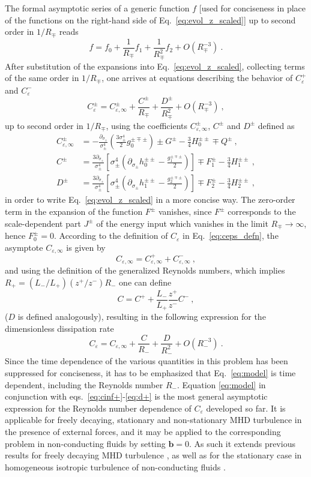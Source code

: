 \documentclass[aps,pre,onecolumn,superscriptaddress,notitlepage]{revtex4-1}
\newcommand{\Ceps}{C_\varepsilon}
\newcommand{\Cinf}{C_{\varepsilon,\infty}}
\newcommand{\sigmapm}{\sigma_\pm}
\renewcommand{\vec}[1]{\bm{#1}}
\newcommand{\beq}{\begin{equation}}
\newcommand{\eeq}{\end{equation}}
\begin{document}
The formal asymptotic series of a generic function $f$ [used for conciseness in place of
the functions on the right-hand side of Eq.~\eqref{eq:evol_z_scaled}]
up to second order in $1/R_\mp$ reads
\begin{equation}
\label{eq:asymp_F}
f= f_{0}+ \frac{1}{R_\mp}f_{1} 
+ \frac{1}{R_\mp^2}f_{2} + O(R_\mp^{-3}) \ .  
\end{equation}
After substitution of the expansions into
Eq.~\eqref{eq:evol_z_scaled}, collecting terms of the same order in $1/R_\mp$,
one arrives at equations describing the behavior of $\Ceps^+$ and $\Ceps^-$
\beq
\Ceps^\pm = \Cinf^\pm + \frac{C^\pm}{R_{\mp}} + \frac{D^\pm}{R_{\mp}^2} + O(R_{\mp}^{-3}) \ ,
 \label{eq:model+}
\eeq
up to second order in $1/R_{\mp}$,
using the coefficients $\Cinf^\pm$, $C^\pm$ and $D^\pm$ defined as
\begin{align}
\label{eq:cinf+}
\Cinf^\pm &= -\frac{\partial_{\sigmapm}}{\sigmapm^4} \left(\frac{3\sigmapm^4}{2}g_0^{\pm\mp\pm}\right)
  \pm  G^\pm - \frac{3}{4} H_{0}^{\pm\pm} \mp Q^\pm \ , \\
\label{eq:c+}
C^\pm &=\frac{3\partial_{\sigmapm}}{\sigmapm^4} \left[ \sigmapm^4 \left( \partial_{\sigmapm} 
h_{0}^{\pm\pm} - \frac{g_1^{\pm\mp\pm}}{2} \right)\right] 
 \mp F_1^\pm - \frac{3}{4} H_1^{\pm\pm}\ , \\ 
\label{eq:d+}
D^\pm &=\frac{3\partial_{\sigmapm}}{\sigmapm^4} \left[ \sigmapm^4 \left( \partial_{\sigmapm} 
h_{1}^{\pm\pm} - \frac{g_2^{\pm\mp\pm}}{2} \right)\right] 
 \mp F_2^\pm - \frac{3}{4} H_2^{\pm\pm}\ , 
\end{align}
in order to write Eq.~\eqref{eq:evol_z_scaled} in a more concise way.
The zero-order term in the expansion of the function $F^\pm$ vanishes, 
since $F^\pm$ corresponds to the scale-dependent part $J^\pm$ of the energy
input which vanishes in the limit $R_\mp \to \infty$, hence $F_0^\pm =0$.
According to the definition of $\Ceps$ in Eq.~\eqref{eq:ceps_defn}, the asymptote $\Cinf$ is given by 
\beq
\Cinf = \Cinf^+ + \Cinf^- \ ,
\eeq
and using the definition of the generalized Reynolds numbers, which implies
$R_+ = (L_-/L_+)(z^+/z^-)R_-$ one can define
\beq
C=  C^+ + \frac{L_-}{L_+} \frac{z^+}{z^-} C^-  \ ,
\eeq
($D$ is defined analogously), resulting in the following expression for the dimensionless
dissipation rate 
\beq
\Ceps = \Cinf + \frac{C}{R_-} + \frac{D}{R_-^2} + O(R_-^{-3}) \ .
 \label{eq:model}
\eeq
Since the time dependence of the various quantities in this problem has been
suppressed for conciseness, it has to be emphasized 
that Eq.~\eqref{eq:model} is time dependent, including the Reynolds
number $R_-$. 
Equation \eqref{eq:model} in conjunction with eqs.~\eqref{eq:cinf+}-\eqref{eq:d+}
is the most general asymptotic expression for the Reynolds number dependence 
of $\Ceps$ developed so far. It is applicable for freely decaying, stationary and non-stationary 
MHD turbulence in the presence of external forces, and it may be applied to the corresponding 
problem in non-conducting fluids 
by setting $\vec{b} =0$. As such it extends previous results for freely decaying 
MHD turbulence \cite{Linkmann15a}, as well as for the stationary case in 
homogeneous isotropic turbulence of non-conducting fluids \cite{McComb15a}. 
\end{document}
